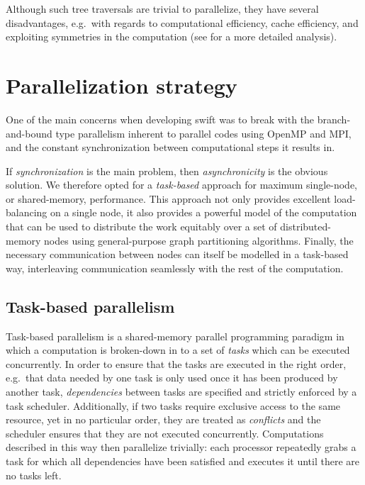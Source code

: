 \documentclass{sig-alternate-05-2015}
\newcommand{\swift}{{\sc swift}\xspace}
\begin{document}
Although such tree traversals are trivial to parallelize, they
have several disadvantages, e.g.~with regards to computational
efficiency, cache efficiency, and exploiting symmetries in the
computation (see \cite{ref:Gonnet2015} for a more detailed
analysis).



\section{Parallelization strategy}

One of the main concerns when developing \swift was to break
with the branch-and-bound type parallelism inherent to parallel
codes using OpenMP and MPI, and the constant synchronization
between computational steps it results in.

If {\em synchronization} is the main problem, then {\em
  asynchronicity} is the obvious solution.  We therefore opted for a
{\em task-based} approach for maximum single-node, or shared-memory,
performance.  This approach not only provides excellent load-balancing
on a single node, it also provides a powerful model of the computation
that can be used to distribute the work equitably over a set of
distributed-memory nodes using general-purpose graph partitioning
algorithms.  Finally, the necessary communication between nodes can
itself be modelled in a task-based way, interleaving communication
seamlessly with the rest of the computation.


\subsection{Task-based parallelism}

Task-based parallelism is a shared-memory parallel programming
paradigm in which a computation is broken-down in to a set of
{\em tasks} which can be executed  concurrently.
In order to ensure that the tasks are executed in the right
order, e.g.~that data needed by one task is only used once it
has been produced by another task, {\em dependencies} between
tasks are specified and strictly enforced by a task scheduler.
Additionally, if two tasks require exclusive access to the same
resource, yet in no particular order, they are treated as
{\em conflicts} and the scheduler ensures that they are not executed
concurrently.
Computations described in this way then parallelize trivially:
each processor repeatedly grabs a task for which all dependencies
have been satisfied and executes it until there are no tasks left.
\end{document}
